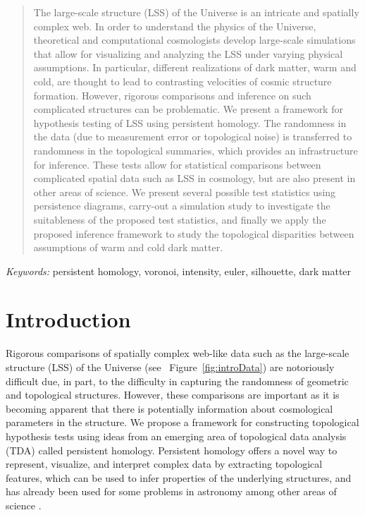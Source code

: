 \documentclass[12pt]{article}
\newcommand{\figref}[1]{Figure~\ref{#1}}
\begin{document}
\bigskip
\begin{abstract}
The large-scale structure (LSS) of the Universe is an intricate and spatially complex web. In order to understand the physics of the Universe, theoretical and computational cosmologists develop large-scale simulations that allow for visualizing and analyzing the LSS under varying physical assumptions. In particular, different realizations of dark matter, warm and cold, are thought to lead to contrasting velocities of cosmic structure formation. However, rigorous comparisons and inference on such complicated structures can be problematic.  We present a framework for hypothesis testing of LSS using persistent homology. The randomness in the data (due to measurement error or topological noise) is transferred to randomness in the topological summaries, which provides an infrastructure for inference. These tests allow for statistical comparisons between complicated spatial data such as LSS in cosmology, but are also present in other areas of science. We present several possible test statistics using persistence diagrams, carry-out a simulation study to investigate the suitableness of the proposed test statistics, and finally we apply the proposed inference framework to study the topological disparities between assumptions of warm and cold dark matter.
\end{abstract}

\noindent%
{\it Keywords:} persistent homology, voronoi, intensity, euler, silhouette, dark matter
\vfill


\newpage
{} %
\section{Introduction}
\label{sec:intro}

Rigorous comparisons of spatially complex web-like data such as the large-scale structure (LSS) of the Universe (see ~\figref{fig:introData}) are notoriously difficult due, in part, to the difficulty in capturing the randomness of geometric and topological structures.  However, these comparisons are important as it is becoming apparent that there is potentially information about cosmological parameters in the structure. We propose a framework for constructing topological hypothesis tests using ideas from an emerging area of topological data analysis (TDA) called persistent homology. Persistent homology offers a novel way to represent, visualize, and interpret complex data by extracting topological features, which can be used to infer properties of the underlying structures, and has already been used for some problems in astronomy \citep{Sousbie2011, SousbieEtAl2011, van2011alpha,cisewski2014non} among other areas of science \citep{bendich2014persistent, duong2012closed}.
\end{document}
